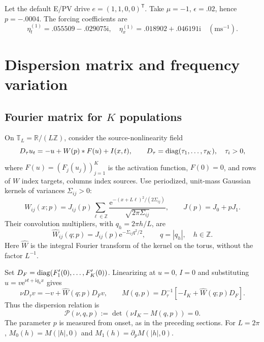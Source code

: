 \documentclass[11pt]{article}
\newcommand{\ii}{\mathrm{i}}
\newcommand{\ee}{\mathrm{e}}
\newcommand{\T}{\mathbb{T}}
\begin{document}
Let the default E/PV drive $e=(1,1,0,0)^{\mathsf T}$.
Take $\mu=-1$, $\epsilon=.02$, hence
$p=-.0004$. The  forcing coefficients are
\begin{equation}
 \eta_t^{(1)}=.055509-.029075\ii,\quad
 \eta_x^{(1)}=.018902+.046191\ii
 \quad(\mathrm{ms}^{-1}).
\end{equation}

\section{Dispersion matrix and frequency variation}
\label{sec:dispersion}

\subsection{Fourier matrix for $K$ populations}
On $\T_L=\mathbb R/(L\mathbb Z)$, consider the source-nonlinearity field
\begin{equation}
 D_\tau u_t=-u+W(p)*F(u)+I(x,t),\qquad
 D_\tau=\operatorname{diag}(\tau_1,\ldots,\tau_K),\quad \tau_i>0,
 \label{eq:population-field}
\end{equation}
where $F(u)=(F_j(u_j))_{j=1}^K$ is the activation function, $F(0)=0$,
and rows of $W$ index targets, columns index sources.
Use periodized, unit-mass Gaussian kernels of variances $\Sigma_{ij}>0$:
\begin{equation}
 W_{ij}(x;p)=J_{ij}(p)\sum_{\ell\in\mathbb Z}
 \frac{\ee^{-(x+L\ell)^2/(2\Sigma_{ij})}}{\sqrt{2\pi\Sigma_{ij}}},
 \qquad J(p)=J_0+pJ_1.
 \label{eq:population-kernels}
\end{equation}
Their convolution multipliers, with $q_h=2\pi h/L$, are
\begin{equation}
 \widehat W_{ij}(q;p)=J_{ij}(p)\ee^{-\Sigma_{ij}q^2/2},
 \qquad q=|q_h|,\quad h\in\mathbb Z.
 \label{eq:population-symbol}
\end{equation}
Here $\widehat W$ is the integral Fourier transform of the kernel on the
torus, without the factor $L^{-1}$.

Set $D_F=\operatorname{diag}(F'_1(0),\ldots,F'_K(0))$. Linearizing at $u=0$, $I=0$
and substituting $u=v\ee^{\nu t+\ii q_hx}$ gives
\begin{equation}
 \nu D_\tau v=-v+\widehat W(q;p)D_Fv,
 \qquad
 \boxed{M(q,p)=D_\tau^{-1}\left[-I_K+\widehat W(q;p)D_F\right].}
 \label{eq:dispersion-matrix}
\end{equation}
Thus the dispersion relation is
\begin{equation}
 \mathcal P(\nu,q,p):=\det(\nu I_K-M(q,p))=0.
 \label{eq:dispersion-polynomial}
\end{equation}
The parameter $p$ is measured from onset, as in the preceding sections.
For $L=2\pi$, $M_0(h)=M(|h|,0)$ and $M_1(h)=\partial_pM(|h|,0)$.
\end{document}
